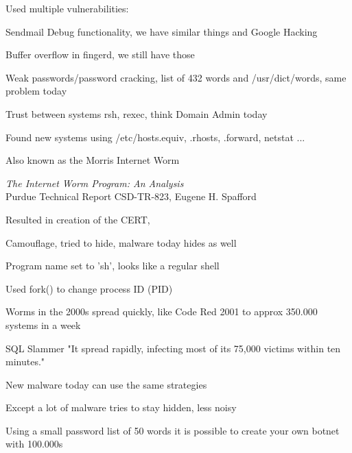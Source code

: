 \documentclass[Screen16to9,17pt]{foils}
\begin{document}
\begin{list1}
\item Used multiple vulnerabilities:
\begin{list2}
\item Sendmail Debug functionality, we have similar things and Google Hacking
\item Buffer overflow in fingerd, we still have those
\item Weak passwords/password cracking, list of 432 words and /usr/dict/words, same problem today
\item Trust between systems rsh, rexec, think Domain Admin today
\item Found new systems using /etc/hosts.equiv, .rhosts, .forward, netstat ...
\end{list2}
\item Also known as the Morris Internet Worm
\item \emph{The Internet Worm Program: An Analysis}\\
Purdue Technical Report CSD-TR-823, Eugene H. Spafford
\item Resulted in creation of the CERT, 
\end{list1}


\begin{list1}
\item Camouflage, tried to hide, malware today hides as well
\begin{list2}
\item Program name set to 'sh', looks like a regular shell
\item Used fork() to change process ID (PID)
\item Worms in the 2000s spread quickly, like Code Red 2001 to approx 350.000 systems in a week
\item SQL Slammer "It spread rapidly, infecting most of its 75,000 victims within ten minutes."
\end{list2}
\vskip 1cm
\item New malware today can use the same strategies
\item Except a lot of malware tries to stay hidden, less noisy
\item Using a small password list of 50 words it is possible to create your own botnet with 100.000s
\end{list1}


\end{document}
